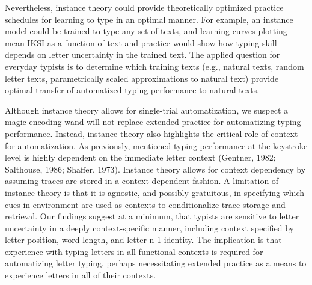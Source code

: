 \documentclass[,man,donotrepeattitle,floatsintext]{apa6}
\begin{document}
Nevertheless, instance theory could provide theoretically optimized practice schedules for learning to type in an optimal manner. For example, an instance model could be trained to type any set of texts, and learning curves plotting mean IKSI as a function of text and practice would show how typing skill depends on letter uncertainty in the trained text. The applied question for everyday typists is to determine which training texts (e.g., natural texts, random letter texts, parametrically scaled approximations to natural text) provide optimal transfer of automatized typing performance to natural texts.

Although instance theory allows for single-trial automatization, we suspect a magic encoding wand will not replace extended practice for automatizing typing performance. Instead, instance theory also highlights the critical role of context for automatization. As previously, mentioned typing performance at the keystroke level is highly dependent on the immediate letter context (Gentner, 1982; Salthouse, 1986; Shaffer, 1973). Instance theory allows for context dependency by assuming traces are stored in a context-dependent fashion. A limitation of instance theory is that it is agnostic, and possibly gratuitous, in specifying which cues in environment are used as contexts to conditionalize trace storage and retrieval. Our findings suggest at a minimum, that typists are sensitive to letter uncertainty in a deeply context-specific manner, including context specified by letter position, word length, and letter n-1 identity. The implication is that experience with typing letters in all functional contexts is required for automatizing letter typing, perhaps necessitating extended practice as a means to experience letters in all of their contexts.
\end{document}
